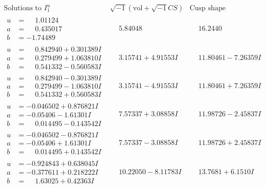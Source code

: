 \documentclass[1p]{elsarticle_modified}
\theoremstyle{definition}
\newcommand{\I}{\sqrt{-1}}
\begin{document}
$$\begin{array}{c|c|c}  
\text{Solutions to }I^u_{1}& \I (\text{vol} + \sqrt{-1}CS) & \text{Cusp shape}\\
 \hline 
\begin{aligned}
u &= \phantom{-}1.01124\phantom{ +0.000000I} \\
a &= \phantom{-}0.435017\phantom{ +0.000000I} \\
b &= -1.74489\phantom{ +0.000000I}\end{aligned}
 & \phantom{-}5.84048\phantom{ +0.000000I} & \phantom{-}16.2440\phantom{ +0.000000I} \\ \hline\begin{aligned}
u &= \phantom{-}0.842940 + 0.301389 I \\
a &= \phantom{-}0.279499 + 1.063810 I \\
b &= \phantom{-}0.541332 - 0.560583 I\end{aligned}
 & \phantom{-}3.15741 + 4.91553 I & \phantom{-}11.80461 - 7.26359 I \\ \hline\begin{aligned}
u &= \phantom{-}0.842940 - 0.301389 I \\
a &= \phantom{-}0.279499 - 1.063810 I \\
b &= \phantom{-}0.541332 + 0.560583 I\end{aligned}
 & \phantom{-}3.15741 - 4.91553 I & \phantom{-}11.80461 + 7.26359 I \\ \hline\begin{aligned}
u &= -0.046502 + 0.876821 I \\
a &= -0.05406 - 1.61301 I \\
b &= \phantom{-}0.014495 - 0.143542 I\end{aligned}
 & \phantom{-}7.57337 + 3.08858 I & \phantom{-}11.98726 - 2.45837 I \\ \hline\begin{aligned}
u &= -0.046502 - 0.876821 I \\
a &= -0.05406 + 1.61301 I \\
b &= \phantom{-}0.014495 + 0.143542 I\end{aligned}
 & \phantom{-}7.57337 - 3.08858 I & \phantom{-}11.98726 + 2.45837 I \\ \hline\begin{aligned}
u &= -0.924843 + 0.638045 I \\
a &= -0.377611 + 0.218222 I \\
b &= \phantom{-}1.63025 + 0.42363 I\end{aligned}
 & \phantom{-}10.22050 - 8.11783 I & \phantom{-}13.7681 + 6.1510 I \\ \hline\begin{aligned}

\end{aligned}
\end{array}$$
\end{document}
